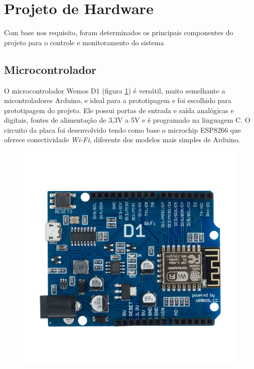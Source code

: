 \section{Projeto de Hardware}


Com base nos requisito, foram determinados os principais componentes do projeto
para o controle e monitoramento do sistema

\subsection{Microcontrolador}

O microcontrolador Wemos D1 (figura \ref{fig:wemos}) é versátil, muito semelhante a micontroladores Arduino, e ideal para a prototipagem e foi escolhido para prototipagem do projeto. Ele possui portas de entrada e saída analógicas e digitais, fontes de alimentação de 3,3V a 5V e é programado na linguagem C. O circuito da placa foi desenvolvido tendo como base o microchip ESP8266 que oferece conectividade \textit{Wi-Fi}, diferente dos modelos mais simples de Arduino.

\begin{figure}[h]
    \centering
    \includegraphics[scale=0.40]{figuras/projeto/hardware/wemos_d1.png}
    \label{fig:wemos}
\end{figure}

